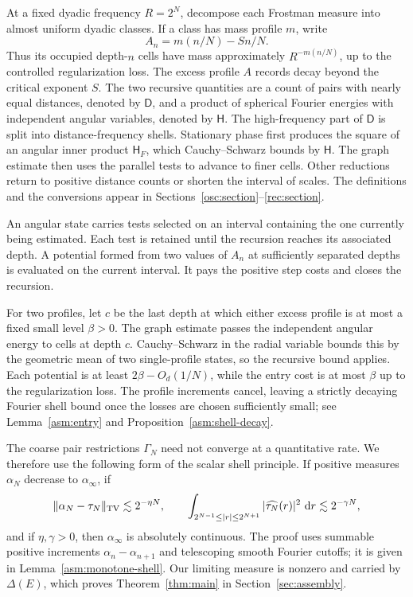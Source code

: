 At a fixed dyadic frequency \(R=2^N\), decompose each Frostman measure into
almost uniform dyadic classes. If a class has mass profile \(m\), write
\[
 A_n=m(n/N)-S n/N.
\]
Thus its occupied depth-\(n\) cells have mass approximately
\(R^{-m(n/N)}\), up to the controlled regularization loss.
The excess profile \(A\) records decay beyond the critical exponent \(S\).
The two recursive quantities are a count of pairs with nearly
equal distances, denoted by \(\mathsf D\), and a product of spherical
Fourier energies with independent angular variables, denoted by
\(\mathsf H\). The high-frequency part of \(\mathsf D\) is split into
distance-frequency shells. Stationary phase first produces the square of an angular inner product
\(\mathsf H_F\), which Cauchy--Schwarz bounds by \(\mathsf H\).
The graph estimate then uses the parallel tests to advance to finer
cells. Other reductions return to positive distance counts or shorten
the interval of scales. The definitions and the conversions appear in
Sections~\ref{osc:section}--\ref{rec:section}.

An angular state carries tests selected on an interval containing the one
currently being estimated. Each test is retained until the recursion
reaches its associated depth. A potential formed from two values of \(A_n\)
at sufficiently separated depths is evaluated on the current interval.
It pays the positive step costs and closes the recursion.

For two profiles, let \(c\) be the last depth at which either excess
profile is at most a fixed small level \(\beta>0\). The graph estimate
passes the independent angular energy to cells at depth \(c\).
Cauchy--Schwarz in the radial variable bounds this by the geometric
mean of two single-profile states, so the recursive bound applies.
Each potential is at least \(2\beta-O_d(1/N)\), while the entry cost
is at most \(\beta\) up to the regularization loss. The profile
increments cancel, leaving a strictly decaying Fourier shell bound
once the losses are chosen sufficiently small; see
Lemma~\ref{asm:entry} and Proposition~\ref{asm:shell-decay}.

The coarse pair restrictions \(\Gamma_N\) need not converge at a
quantitative rate. We therefore use the following form of the scalar
shell principle. If positive measures \(\alpha_N\) decrease to
\(\alpha_\infty\), if
\[
 \|\alpha_N-\tau_N\|_{\mathrm{TV}}\lesssim 2^{-\eta N},
 \qquad
 \int_{2^{N-1}\le |r|\le2^{N+1}}
       |\widehat{\tau_N}(r)|^2\,\mathop{}\!\mathrm d r\lesssim 2^{-\gamma N},
\]
and if \(\eta,\gamma>0\), then \(\alpha_\infty\) is absolutely continuous.
The proof uses summable positive increments
\(\alpha_n-\alpha_{n+1}\) and telescoping smooth Fourier cutoffs;
it is given in Lemma~\ref{asm:monotone-shell}.
Our limiting measure is nonzero and carried by \(\Delta(E)\), which proves
Theorem~\ref{thm:main} in Section~\ref{sec:assembly}.

